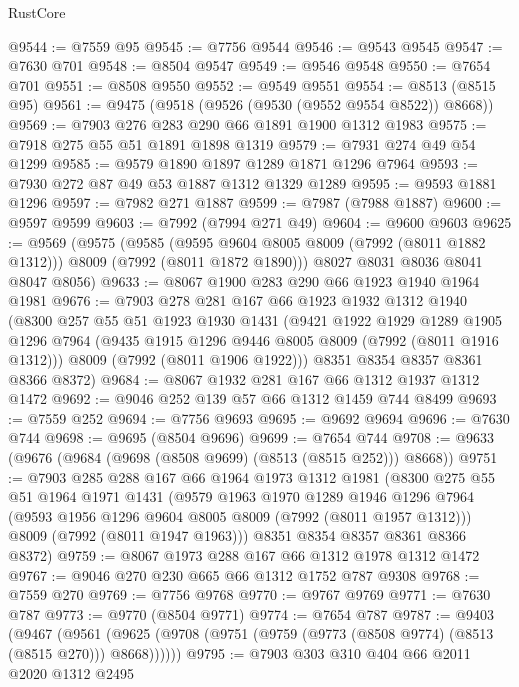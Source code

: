 \begin{lexlean}{RustCore}
\begin{coremodule}
@9544 := @7559 @95
@9545 := @7756 @9544
@9546 := @9543 @9545
@9547 := @7630 @701
@9548 := @8504 @9547
@9549 := @9546 @9548
@9550 := @7654 @701
@9551 := @8508 @9550
@9552 := @9549 @9551
@9554 := @8513 (@8515 @95)
@9561 := @9475 (@9518 (@9526 (@9530 (@9552 @9554 @8522)) @8668))
@9569 := @7903 @276 @283 @290 @66 @1891 @1900 @1312 @1983
@9575 := @7918 @275 @55 @51 @1891 @1898 @1319
@9579 := @7931 @274 @49 @54 @1299
@9585 := @9579 @1890 @1897 @1289 @1871 @1296 @7964
@9593 := @7930 @272 @87 @49 @53 @1887 @1312 @1329 @1289
@9595 := @9593 @1881 @1296
@9597 := @7982 @271 @1887
@9599 := @7987 (@7988 @1887)
@9600 := @9597 @9599
@9603 := @7992 (@7994 @271 @49)
@9604 := @9600 @9603
@9625 := @9569
    (@9575
      (@9585
        (@9595 @9604 @8005 @8009 (@7992 (@8011 @1882 @1312)))
        @8009
        (@7992 (@8011 @1872 @1890)))
      @8027
      @8031
      @8036
      @8041
      @8047
      @8056)
@9633 := @8067 @1900 @283 @290 @66 @1923 @1940 @1964 @1981
@9676 := @7903
    @278
    @281
    @167
    @66
    @1923
    @1932
    @1312
    @1940
    (@8300
      @257
      @55
      @51
      @1923
      @1930
      @1431
      (@9421
        @1922
        @1929
        @1289
        @1905
        @1296
        @7964
        (@9435 @1915 @1296 @9446 @8005 @8009 (@7992 (@8011 @1916 @1312)))
        @8009
        (@7992 (@8011 @1906 @1922)))
      @8351
      @8354
      @8357
      @8361
      @8366
      @8372)
@9684 := @8067 @1932 @281 @167 @66 @1312 @1937 @1312 @1472
@9692 := @9046 @252 @139 @57 @66 @1312 @1459 @744 @8499
@9693 := @7559 @252
@9694 := @7756 @9693
@9695 := @9692 @9694
@9696 := @7630 @744
@9698 := @9695 (@8504 @9696)
@9699 := @7654 @744
@9708 := @9633 (@9676 (@9684 (@9698 (@8508 @9699) (@8513 (@8515 @252))) @8668))
@9751 := @7903
    @285
    @288
    @167
    @66
    @1964
    @1973
    @1312
    @1981
    (@8300
      @275
      @55
      @51
      @1964
      @1971
      @1431
      (@9579
        @1963
        @1970
        @1289
        @1946
        @1296
        @7964
        (@9593 @1956 @1296 @9604 @8005 @8009 (@7992 (@8011 @1957 @1312)))
        @8009
        (@7992 (@8011 @1947 @1963)))
      @8351
      @8354
      @8357
      @8361
      @8366
      @8372)
@9759 := @8067 @1973 @288 @167 @66 @1312 @1978 @1312 @1472
@9767 := @9046 @270 @230 @665 @66 @1312 @1752 @787 @9308
@9768 := @7559 @270
@9769 := @7756 @9768
@9770 := @9767 @9769
@9771 := @7630 @787
@9773 := @9770 (@8504 @9771)
@9774 := @7654 @787
@9787 := @9403
    (@9467 (@9561 (@9625 (@9708 (@9751 (@9759 (@9773 (@8508 @9774) (@8513 (@8515 @270))) @8668))))))
@9795 := @7903 @303 @310 @404 @66 @2011 @2020 @1312 @2495

\end{coremodule}
\end{lexlean}
